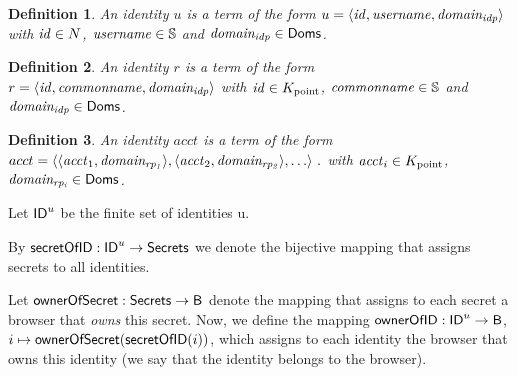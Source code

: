 \documentclass[letterpaper,onecolumn,10pt]{article}
\newtheorem{definition}{Definition}
\begin{document}


\begin{definition}
  An \emph{identity} $u$ is a term of the form 
  $u=\langle\mathit{id},\mathit{username},\mathit{domain_{idp}}\rangle$ 
  with $\mathit{id}\in N$, $\mathit{username}\in \mathbb{S}$ and $\mathit{domain_{idp}} \in \mathsf{Doms}$.


\end{definition}

\begin{definition}
  An \emph{identity} $r$ is a term of the form 
  $r=\langle\mathit{id},\mathit{commonname},\mathit{domain_{idp}}\rangle$ 
  with $\mathit{id}\in K_{\text{point}}$, $\mathit{commonname}\in \mathbb{S}$ and $\mathit{domain_{idp}} \in \mathsf{Doms}$.
\end{definition}

\begin{definition}
  An \emph{identity} $acct$ is a term of the form 
  $acct=\langle\langle\mathit{acct}_1,\mathit{domain_{rp_1}}\rangle,\langle\mathit{acct}_2,\mathit{domain_{rp_2}}\rangle, \ldots\rangle \ .$ 
  with $\mathit{acct}_i\in K_{\text{point}}$, $\mathit{domain_{rp_i}}\in \mathsf{Doms}$.
\end{definition}

Let $\mathsf{ID}^u$ be the finite set of identities u.

By $\mathsf{secretOfID}:\mathsf{ID}^u \to \mathsf{Secrets}$ we denote the bijective mapping
that assigns secrets to all identities. 

Let $\mathsf{ownerOfSecret}: \mathsf{Secrets} \to \mathsf{B}$ denote the mapping that
assigns to each secret a browser that \emph{owns} this secret. Now, we
define the mapping $\mathsf{ownerOfID}: \mathsf{ID}^u \to \mathsf{B}$, $i \mapsto
\mathsf{ownerOfSecret}(\mathsf{secretOfID}(i))$, which assigns to each identity the
browser that owns this identity (we say that the identity belongs to
the browser).
\end{document}
